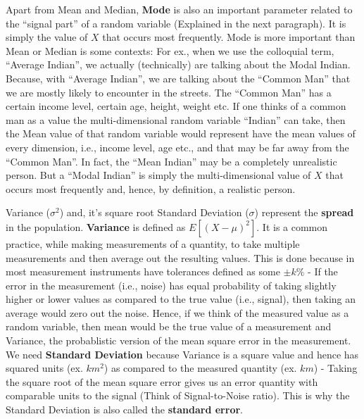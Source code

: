 Apart from Mean and Median, \textbf{Mode} is also an important parameter related to the ``signal part'' of a random variable (Explained in the next paragraph). It is simply the value of $X$ that occurs most frequently. Mode is more important than Mean or Median is some contexts: For ex., when we use the colloquial term, ``Average Indian'', we actually (technically) are talking about the Modal Indian. Because, with ``Average Indian'', we are talking about the ``Common Man'' that we are mostly likely to encounter in the streets. The ``Common Man'' has a certain income level, certain age, height, weight etc. If one thinks of a common man as a value the multi-dimensional random variable ``Indian'' can take, then the Mean value of that random variable would represent have the mean values of every dimension, i.e., income level, age etc., and that may be far away from the ``Common Man''. In fact, the ``Mean Indian'' may be a completely unrealistic person. But a ``Modal Indian'' is simply the multi-dimensional value of $X$ that occurs most frequently and, hence, by definition, a realistic person. 

Variance ($\sigma^2$) and, it's square root Standard Deviation ($\sigma$) represent the \textbf{spread} in the population. \textbf{Variance} is defined as $E[(X-\mu)^2]$. It is a common practice, while making measurements of a quantity, to take multiple measurements and then average out the resulting values. This is done because in most measurement instruments have tolerances defined as some $\pm k\%$ - If the error in the measurement (i.e., noise) has equal probability of taking slightly higher or lower values as compared to the true value (i.e., signal), then taking an average would zero out the noise. Hence, if we think of the measured value as a random variable, then mean would be the true value of a measurement and Variance, the probablistic version of the mean square error in the measurement. We need \textbf{Standard Deviation} because Variance is a square value and hence has squared units (ex. $km^2$) as compared to the measured quantity (ex. $km$) - Taking the square root of the mean square error gives us an error quantity with comparable units to the signal (Think of Signal-to-Noise ratio). This is why the Standard Deviation is also called the \textbf{standard error}.

